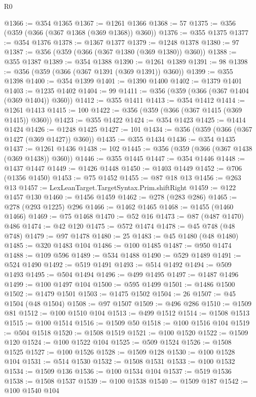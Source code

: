 \begin{lexlean}{R0}
\begin{coremodule}
@1366 := @354 @1365
@1367 := @1261 @1366
@1368 := 57
@1375 := @356 (@359 (@366 (@367 @1368 (@369 @1368)) @360))
@1376 := @355 @1375
@1377 := @354 @1376
@1378 := @1367 @1377
@1379 := @1248 @1378
@1380 := 97
@1387 := @356 (@359 (@366 (@367 @1380 (@369 @1380)) @360))
@1388 := @355 @1387
@1389 := @354 @1388
@1390 := @1261 @1389
@1391 := 98
@1398 := @356 (@359 (@366 (@367 @1391 (@369 @1391)) @360))
@1399 := @355 @1398
@1400 := @354 @1399
@1401 := @1390 @1400
@1402 := @1379 @1401
@1403 := @1235 @1402
@1404 := 99
@1411 := @356 (@359 (@366 (@367 @1404 (@369 @1404)) @360))
@1412 := @355 @1411
@1413 := @354 @1412
@1414 := @1261 @1413
@1415 := 100
@1422 := @356 (@359 (@366 (@367 @1415 (@369 @1415)) @360))
@1423 := @355 @1422
@1424 := @354 @1423
@1425 := @1414 @1424
@1426 := @1248 @1425
@1427 := 101
@1434 := @356 (@359 (@366 (@367 @1427 (@369 @1427)) @360))
@1435 := @355 @1434
@1436 := @354 @1435
@1437 := @1261 @1436
@1438 := 102
@1445 := @356 (@359 (@366 (@367 @1438 (@369 @1438)) @360))
@1446 := @355 @1445
@1447 := @354 @1446
@1448 := @1437 @1447
@1449 := @1426 @1448
@1450 := @1403 @1449
@1452 := @706 (@1356 @1450)
@1453 := @75 @1452
@1455 := @87 @18 @13
@1456 := @263 @13
@1457 := LexLeanTarget.TargetSyntax.Prim.shiftRight
@1459 := @122 @1457 @130
@1460 := @1456 @1459
@1462 := @278 (@283 @286)
@1465 := @278 (@293 @1225) @296
@1466 := @1462 @1465
@1468 := @1455 (@1460 @1466)
@1469 := @75 @1468
@1470 := @52 @16
@1473 := @87 (@487 @1470) @486
@1474 := @42 @120
@1475 := @572 @1474
@1478 := @45 @748 (@48 @748)
@1479 := @97 @1478
@1480 := 25
@1483 := @45 @1480 (@48 @1480)
@1485 := @320 @1483 @104
@1486 := @100 @1485
@1487 := @950 @1474
@1488 := @109 @596
@1489 := @534 @1488
@1490 := @529 @1489
@1491 := @524 @1490
@1492 := @519 @1491
@1493 := @514 @1492
@1494 := @509 @1493
@1495 := @504 @1494
@1496 := @499 @1495
@1497 := @1487 @1496
@1499 := @100 @1497 @104
@1500 := @595 @1499
@1501 := @1486 @1500
@1502 := @1479 @1501
@1503 := @1475 @1502
@1504 := 26
@1507 := @45 @1504 (@48 @1504)
@1508 := @97 @1507
@1509 := @496 @286
@1510 := @1509 @81
@1512 := @100 @1510 @104
@1513 := @499 @1512
@1514 := @1508 @1513
@1515 := @100 @1514
@1516 := @1509 @50
@1518 := @100 @1516 @104
@1519 := @504 @1518
@1520 := @1508 @1519
@1521 := @100 @1520
@1522 := @1509 @120
@1524 := @100 @1522 @104
@1525 := @509 @1524
@1526 := @1508 @1525
@1527 := @100 @1526
@1528 := @1509 @128
@1530 := @100 @1528 @104
@1531 := @514 @1530
@1532 := @1508 @1531
@1533 := @100 @1532
@1534 := @1509 @136
@1536 := @100 @1534 @104
@1537 := @519 @1536
@1538 := @1508 @1537
@1539 := @100 @1538
@1540 := @1509 @187
@1542 := @100 @1540 @104

\end{coremodule}
\end{lexlean}
